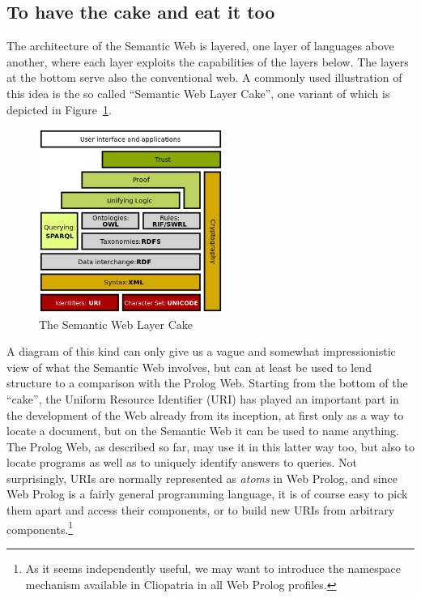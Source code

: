 \documentclass{tlp}
\begin{document}
\subsection{To have the cake and eat it too}\label{sec:have-the-cake}

\noindent The architecture of the Semantic Web is layered, one layer of languages above another, where each layer exploits the capabilities of the layers below. The layers at the bottom serve also the conventional web. A commonly used illustration of this idea is the so called ``Semantic Web Layer Cake'', one variant of which is depicted in Figure~\ref{fig:cake}.

\begin{figure}[h]
    \centering
	\includegraphics[width=6cm]{cake}
    \caption{The Semantic Web Layer Cake}
    \label{fig:cake}
\end{figure}

\noindent A diagram of this kind can only give us a vague and somewhat impressionistic view of what the Semantic Web involves, but can at least be used to lend structure to a comparison with the Prolog Web. Starting from the bottom of the ``cake'', the Uniform Resource Identifier (URI) has played an important part in the development of the Web already from its inception, at first only as a way to locate a document, but on the Semantic Web it can be used to name anything. The Prolog Web, as described so far, may use it in this latter way too, but also to locate programs as well as to uniquely identify answers to queries. Not surprisingly, URIs are normally represented as \textit{atoms} in Web Prolog, and since Web Prolog is a fairly general programming language, it is of course easy to pick them apart and access their components, or to build new URIs from arbitrary components.\footnote{As it seems independently useful, we may want to introduce the namespace mechanism available in Cliopatria in all Web Prolog profiles. }
\end{document}
